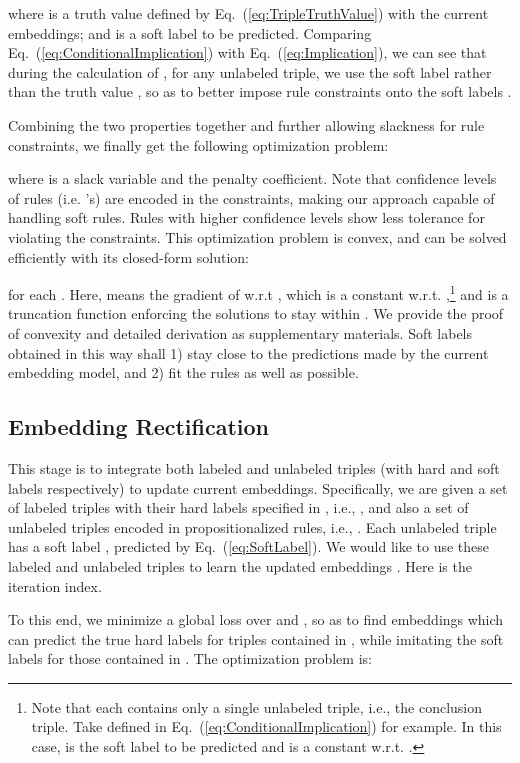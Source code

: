 \documentclass[letterpaper]{article} \usepackage{aaai18}  \usepackage{times}  \usepackage{helvet}  \usepackage{courier}  \usepackage{url}  \usepackage{graphicx}  \usepackage{amsmath}
\begin{document}
where  is a truth value defined by Eq.~(\ref{eq:TripleTruthValue}) with the current embeddings; and  is a soft label to be predicted. Comparing Eq.~(\ref{eq:ConditionalImplication}) with Eq.~(\ref{eq:Implication}), we can see that during the calculation of , for any unlabeled triple, we use the soft label  rather than the truth value , so as to better impose rule constraints onto the soft labels .

Combining the two properties together and further allowing slackness for rule constraints, we finally get the following optimization problem:

where  is a slack variable and  the penalty coefficient. Note that confidence levels of rules (i.e. 's) are encoded in the constraints, making our approach capable of handling soft rules. Rules with higher confidence levels show less tolerance for violating the constraints. This optimization problem is convex, and can be solved efficiently with its closed-form solution:

for each . Here,  means the gradient of  w.r.t , which is a constant w.r.t. ,\footnote{Note that each  contains only a single unlabeled triple, i.e., the conclusion triple. Take  defined in Eq.~(\ref{eq:ConditionalImplication}) for example. In this case,  is the soft label to be predicted and  is a constant w.r.t. .} and  is a truncation function enforcing the solutions to stay within . We provide the proof of convexity and detailed derivation as supplementary materials. Soft labels obtained in this way shall 1) stay close to the predictions made by the current embedding model, and 2) fit the rules as well as possible.

\subsection{Embedding Rectification}
This stage is to integrate both labeled and unlabeled triples (with hard and soft labels respectively) to update current embeddings. Specifically, we are given a set of labeled triples with their hard labels specified in , i.e., , and also a set of unlabeled triples encoded in propositionalized rules, i.e., . Each unlabeled triple  has a soft label , predicted by Eq.~(\ref{eq:SoftLabel}). We would like to use these labeled and unlabeled triples to learn the updated embeddings . Here  is the iteration index.

To this end, we minimize a global loss over  and , so as to find embeddings which can predict the true hard labels for triples contained in , while imitating the soft labels for those contained in . The optimization problem is:
\end{document}
